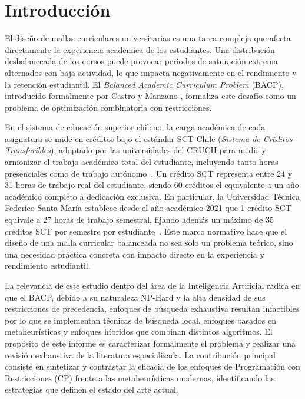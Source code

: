 \documentclass[letter, 10pt]{article}
\begin{document}
\newpage


\section{Introducci\'{o}n}

El dise\~{n}o de mallas curriculares universitarias es una tarea compleja que afecta directamente la experiencia acad\'{e}mica de los estudiantes. Una distribuci\'{o}n desbalanceada de los cursos puede provocar periodos de saturaci\'{o}n extrema alternados con baja actividad, lo que impacta negativamente en el rendimiento y la retenci\'{o}n estudiantil. El \textit{Balanced Academic Curriculum Problem} (BACP), introducido formalmente por Castro y Manzano \cite{Castro2001}, formaliza este desaf\'{i}o como un problema de optimizaci\'{o}n combinatoria con restricciones.


En el sistema de educaci\'on superior chileno, la carga acad\'emica 
de cada asignatura se mide en cr\'editos bajo el est\'andar 
SCT-Chile (\textit{Sistema de Cr\'editos Transferibles}), adoptado 
por las universidades del CRUCH para medir y armonizar el trabajo 
acad\'emico total del estudiante, incluyendo tanto horas presenciales 
como de trabajo aut\'onomo~\cite{sctchile}. Un cr\'edito SCT 
representa entre 24 y 31 horas de trabajo real del estudiante, 
siendo 60 cr\'editos el equivalente a un a\~no acad\'emico completo 
a dedicaci\'on exclusiva.  En particular, la Universidad 
T\'ecnica Federico Santa Mar\'ia establece desde el a\~no acad\'emico 
2021 que 1 cr\'edito SCT equivale a 27 horas de trabajo semestral,  
fijando adem\'as un m\'aximo de 35 cr\'editos SCT por 
semestre por estudiante~\cite{usmcreditos}.  Este marco normativo hace que el 
dise\~no de una malla curricular balanceada no sea solo un problema 
te\'orico, sino una necesidad pr\'actica concreta con impacto directo 
en la experiencia y rendimiento estudiantil.


La relevancia de este estudio dentro del \'{a}rea de la Inteligencia Artificial radica en que el BACP, debido a su naturaleza NP-Hard y la alta densidad de sus restricciones de precedencia, enfoques de b\'usqueda exhaustiva resultan infactibles por lo que se implementan t\'ecnicas de b\'usqueda local, enfoques basados en metaheur\'isticas y enfoques h\'ibridos que combinan distintos algoritmos. El prop\'{o}sito de este informe es caracterizar formalmente el problema y realizar una revisi\'{o}n exhaustiva de la literatura especializada. La contribuci\'{o}n principal consiste en sintetizar y contrastar la eficacia de los enfoques de Programaci\'{o}n con Restricciones (CP) frente a las metaheur\'{i}sticas modernas, identificando las estrategias que definen el estado del arte actual.
\end{document}
